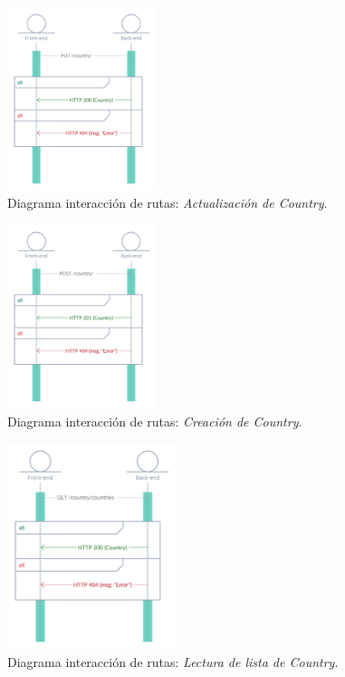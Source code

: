 \begin{figure}[H]
    \centering
    \myfloatalign
    \includegraphics[width=0.39\textwidth]{gfx/diagrama-itr1.png}
    \caption[Diagrama interacción de rutas (1)]{Diagrama interacción de rutas: \textit{Actualización de Country}.}\label{gfx:diagrama-itr1}
\end{figure}

\begin{figure}[H]
    \centering
    \myfloatalign
    \includegraphics[width=0.39\textwidth]{gfx/diagrama-itr2.png}
    \caption[Diagrama interacción de rutas (2)]{Diagrama interacción de rutas: \textit{Creación de Country}.}\label{gfx:diagrama-itr2}
\end{figure}

\begin{figure}[H]
    \centering
    \myfloatalign
    \includegraphics[width=0.44\textwidth]{gfx/diagrama-itr3.png}
    \caption[Diagrama interacción de rutas (3)]{Diagrama interacción de rutas: \textit{Lectura de lista de Country}.}\label{gfx:diagrama-itr3}
\end{figure}

